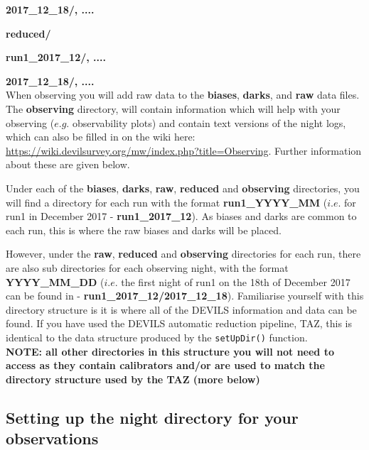 \documentclass[12pt]{article}
\begin{document}
\hspace{20mm} \textbf{2017\_12\_18/, ....} 
\vspace{1mm}

\hspace{10mm} \textbf{reduced/}
\vspace{1mm}

\hspace{15mm} \textbf{run1\_2017\_12/, ....} 
\vspace{1mm}

\hspace{20mm} \textbf{2017\_12\_18/, ....} \\


When observing you will add raw data to the \textbf{biases},  \textbf{darks}, and \textbf{raw} data files. The \textbf{observing} directory, will contain information which will help with your observing ($e.g.$ observability plots) and contain text versions of the night logs, which can also be filled in on the wiki here:  \url{https://wiki.devilsurvey.org/mw/index.php?title=Observing}. Further information about these are given below. 

Under each of the \textbf{biases}, \textbf{darks}, \textbf{raw}, \textbf{reduced} and \textbf{observing} directories, you will find a directory for each run with the format \textbf{run1\_YYYY\_MM} ($i.e.$ for run1 in December 2017 - \textbf{run1\_2017\_12}). As biases and darks are common to each run, this is where the raw biases and darks will be placed. 

However, under the \textbf{raw}, \textbf{reduced} and \textbf{observing} directories for each run, there are also sub directories for each observing night, with the format \textbf{YYYY\_MM\_DD} ($i.e.$ the first night of run1 on the 18th of December 2017 can be found in - \textbf{run1\_2017\_12/2017\_12\_18}). Familiarise yourself with this directory structure is it is where all of the DEVILS information and data can be found. If you have used the DEVILS automatic reduction pipeline, TAZ, this is identical to the data structure produced by the \texttt{setUpDir()} function. \\

\textcolor{PineGreen}{\textbf{NOTE: all other directories in this structure you will not need to access as they contain calibrators and/or are used to match the directory structure used by the TAZ (more below)}}

\subsection{Setting up the night directory for your observations}
\end{document}
